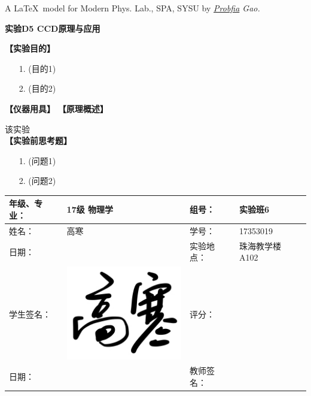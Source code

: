 \documentclass[11pt,a4paper]{ctexart}
\newcommand{\ExpeName}{实验D5 CCD原理与应用}
\newcommand{\cpic}[2]{
\begin{center}
\texttt{[image: \#2]}
\end{center}
}
\begin{document}
\begin{flushright}                                                           %
\tiny{
A \LaTeX \ model for Modern Phys. Lab., SPA, SYSU by \em{\href{https://www.weibo.com/3532532974/profile?rightmod=1&wvr=6&mod=personinfo&is_all=1}{Probfia} Gao.}
}
\end{flushright}

\iffalse
\newpage%
\begin{center}
\LARGE{\textbf{\ExpeName}}
\end{center}
\textbf{【实验目的】}
\begin{enumerate}
 \item[1.] (目的1)
 \item[2.] (目的2)
\end{enumerate}
\textbf{【仪器用具】}
\textbf{【原理概述】}\par
该实验\\
\textbf{【实验前思考题】}
\begin{enumerate}
 \item[1.] (问题1)
 \item[2.] (问题2)
\end{enumerate}

\newpage%
\begin{table}[H]
\centering
\begin{tabular}{|p{32mm}|p{32mm}|p{32mm}|p{32mm}|}
\hline
年级、专业： & 17级 物理学 & 组号： & 实验班6 \\ \hline
姓名： & 高寒 & 学号： & 17353019 \\ \hline
日期： &  & 实验地点： & 珠海教学楼 A102 \\ \hline
学生签名： &  \includegraphics[scale=0.09]{sign}& 评分： &  \\ \hline
日期： &  & 教师签名： &  \\ \hline
\end{tabular}
\end{table}
\end{document}
